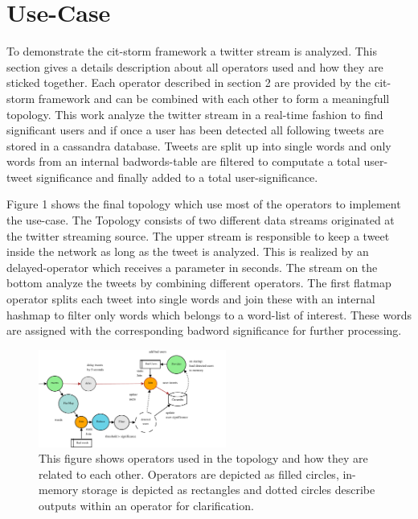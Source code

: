 \section{Use-Case}
\label{sect:useCase}

To demonstrate the cit-storm framework a twitter stream is analyzed. This section gives a details description about all operators used and how they are sticked together. Each operator described in section 2 are provided by the cit-storm framework and can be combined with each other to form a meaningfull topology. This work analyze the twitter stream in a real-time fashion to find significant users and if once a user has been detected all following tweets are stored in a cassandra database. Tweets are split up into single words and only words from an internal badwords-table are filtered to computate a total user-tweet significance and finally added to a total user-significance. \newline

Figure 1 shows the final topology which use most of the operators to implement the use-case. The Topology consists of two different data streams originated at the twitter streaming source. The upper stream is responsible to keep a tweet inside the network as long as the tweet is analyzed. This is realized by an delayed-operator which receives a parameter in seconds. The stream on the bottom analyze the tweets by combining different operators. The first flatmap operator splits each tweet into single words and join these with an internal hashmap to filter only words which belongs to a word-list of interest. These words are assigned with the corresponding badword significance for further processing.

\begin{figure}[h]
  \centering
  \includegraphics[width=0.55\textwidth]{images/AnalyzeTweetsTopology-eps-converted-to.pdf}
  \caption{This figure shows operators used in the topology and how they are related to each other. Operators are depicted as filled circles, in-memory storage is depicted as rectangles and dotted circles describe outputs within an operator for clarification.}
\end{figure}

